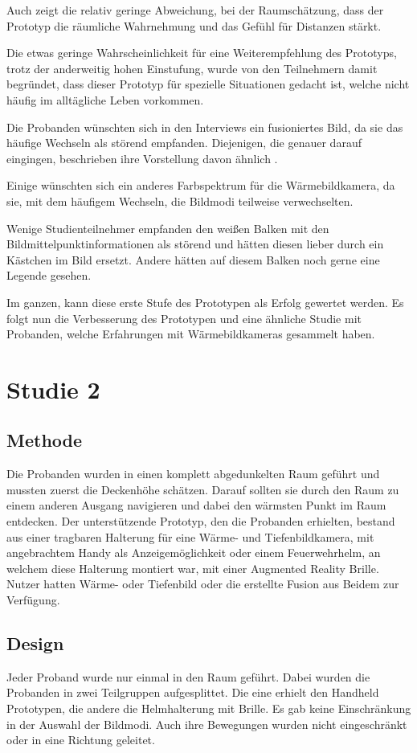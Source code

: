 Auch zeigt die relativ geringe Abweichung, bei der Raumschätzung, dass der Prototyp die räumliche Wahrnehmung und das Gefühl für Distanzen stärkt.

Die etwas geringe Wahrscheinlichkeit für eine Weiterempfehlung des Prototyps, trotz der anderweitig hohen Einstufung, wurde von den Teilnehmern damit begründet, dass dieser Prototyp für spezielle Situationen gedacht ist, welche nicht häufig im alltägliche Leben vorkommen.

Die Probanden wünschten sich in den Interviews ein fusioniertes Bild, da sie das häufige Wechseln als störend empfanden.
Diejenigen, die genauer darauf eingingen, beschrieben ihre Vorstellung davon ähnlich .

Einige wünschten sich ein anderes Farbspektrum für die Wärmebildkamera, da sie, mit dem häufigem Wechseln, die Bildmodi teilweise verwechselten.

Wenige Studienteilnehmer empfanden den weißen Balken mit den Bildmittelpunktinformationen als störend und hätten diesen lieber durch ein Kästchen im Bild ersetzt.
Andere hätten auf diesem Balken noch gerne eine Legende gesehen.

Im ganzen, kann diese erste Stufe des Prototypen als Erfolg gewertet werden.
Es folgt nun die Verbesserung des Prototypen und eine ähnliche Studie mit Probanden, welche Erfahrungen mit Wärmebildkameras gesammelt haben.

\section{Studie 2}

\subsection{Methode}
Die Probanden wurden in einen komplett abgedunkelten Raum geführt und mussten zuerst die Deckenhöhe schätzen.
Darauf sollten sie durch den Raum zu einem anderen Ausgang navigieren und dabei den wärmsten Punkt im Raum entdecken.
Der unterstützende Prototyp, den die Probanden erhielten, bestand aus einer tragbaren Halterung für eine Wärme- und Tiefenbildkamera, mit angebrachtem Handy als Anzeigemöglichkeit oder einem Feuerwehrhelm, an welchem diese Halterung montiert war, mit einer Augmented Reality Brille.
Nutzer hatten Wärme- oder Tiefenbild oder die erstellte Fusion aus Beidem zur Verfügung.

\subsection{Design}
Jeder Proband wurde nur einmal in den Raum geführt.
Dabei wurden die Probanden in zwei Teilgruppen aufgesplittet.
Die eine erhielt den Handheld Prototypen, die andere die Helmhalterung mit Brille.
Es gab keine Einschränkung in der Auswahl der Bildmodi.
Auch ihre Bewegungen wurden nicht eingeschränkt oder in eine Richtung geleitet.

